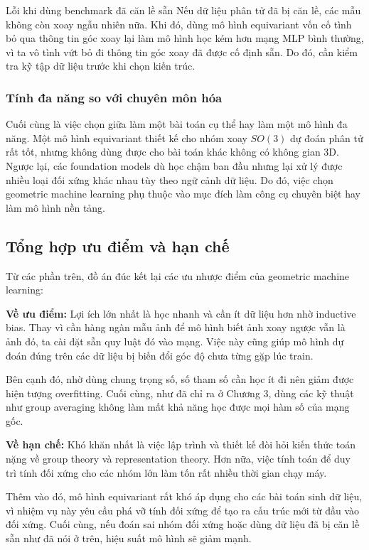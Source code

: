 \begin{warningbox}{Lỗi khi dùng benchmark đã căn lề sẵn}
Nếu dữ liệu phân tử đã bị căn lề, các mẫu không còn xoay ngẫu nhiên nữa. Khi đó, dùng mô hình equivariant vốn cố tình bỏ qua thông tin góc xoay lại làm mô hình học kém hơn mạng MLP bình thường, vì ta vô tình vứt bỏ đi thông tin góc xoay đã được cố định sẵn. Do đó, cần kiểm tra kỹ tập dữ liệu trước khi chọn kiến trúc.
\end{warningbox}

\subsubsection{Tính đa năng so với chuyên môn hóa}

Cuối cùng là việc chọn giữa làm một bài toán cụ thể hay làm một mô hình đa năng. Một mô hình equivariant thiết kế cho nhóm xoay $SO(3)$ dự đoán phân tử rất tốt, nhưng không dùng được cho bài toán khác không có không gian 3D. Ngược lại, các foundation models dù học chậm ban đầu nhưng lại xử lý được nhiều loại đối xứng khác nhau tùy theo ngữ cảnh dữ liệu. Do đó, việc chọn geometric machine learning phụ thuộc vào mục đích làm công cụ chuyên biệt hay làm mô hình nền tảng.

\subsection{Tổng hợp ưu điểm và hạn chế}
\label{subsec:uu-nhuoc-diem}

Từ các phần trên, đồ án đúc kết lại các ưu nhược điểm của geometric machine learning:

\textbf{Về ưu điểm:} Lợi ích lớn nhất là học nhanh và cần ít dữ liệu hơn nhờ inductive bias. Thay vì cần hàng ngàn mẫu ảnh để mô hình biết ảnh xoay ngược vẫn là ảnh đó, ta cài đặt sẵn quy luật đó vào mạng. Việc này cũng giúp mô hình dự đoán đúng trên các dữ liệu bị biến đổi góc độ chưa từng gặp lúc train. 

Bên cạnh đó, nhờ dùng chung trọng số, số tham số cần học ít đi nên giảm được hiện tượng overfitting. Cuối cùng, như đã chỉ ra ở Chương 3, dùng các kỹ thuật như group averaging không làm mất khả năng học được mọi hàm số của mạng gốc.

\textbf{Về hạn chế:} Khó khăn nhất là việc lập trình và thiết kế đòi hỏi kiến thức toán nặng về group theory và representation theory. Hơn nữa, việc tính toán để duy trì tính đối xứng cho các nhóm lớn làm tốn rất nhiều thời gian chạy máy. 

Thêm vào đó, mô hình equivariant rất khó áp dụng cho các bài toán sinh dữ liệu, vì nhiệm vụ này yêu cầu phá vỡ tính đối xứng để tạo ra cấu trúc mới từ đầu vào đối xứng. Cuối cùng, nếu đoán sai nhóm đối xứng hoặc dùng dữ liệu đã bị căn lề sẵn như đã nói ở trên, hiệu suất mô hình sẽ giảm mạnh.

